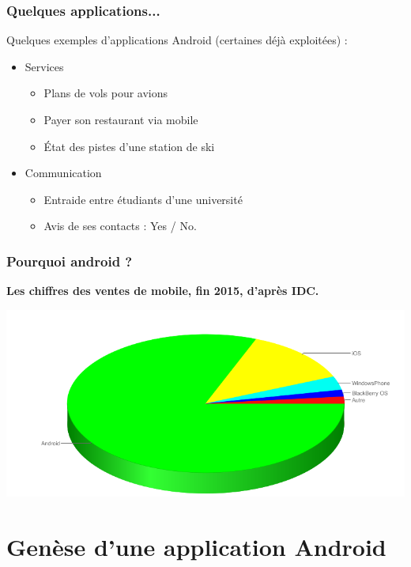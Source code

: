\documentclass{beamer}
\begin{document}
\begin{frame}
\frametitle{Quelques applications...}

\begin{block}{Quelques exemples d'applications Android (certaines déjà exploitées) :}

\begin{itemize}
\item Services
    \begin{itemize}
	\item Plans de vols pour avions
	\item Payer son restaurant via mobile
	\item État des pistes d'une station de ski
	\end{itemize}
\item Communication
	\begin{itemize}
	\item Entraide entre étudiants d'une université
	\item Avis de ses contacts : Yes / No.
	\end{itemize}
\end{itemize}

\end{block}

\end{frame}

\begin{frame}
\frametitle{Pourquoi android ?}

\textbf{Les chiffres des ventes de mobile, fin 2015, d'après IDC.}

\begin{center}
\includegraphics[scale=0.3]{marche-os-2015.png}
\end{center}

\end{frame}

\section{Genèse d'une application Android}
\end{document}
